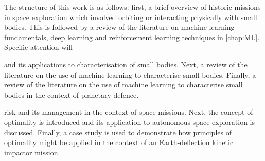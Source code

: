 The structure of this work is as follows: first, a brief overview of historic missions in space exploration which involved orbiting or interacting physically with small bodies. This is followed by a review of the literature on machine learning fundamentals, deep learning and reinforcement learning techniques in \autoref{chap:ML}. Specific attention will 

 and its applications to characterisation of small bodies. Next, a review of the literature on the use of machine learning to characterise small bodies. Finally, a review of the literature on the use of machine learning to characterise small bodies in the context of planetary defence.

risk and its management in the context of space missions. Next, the concept of optimality is introduced and its application to autonomous space exploration is discussed. Finally, a case study is used to demonstrate how principles of optimality might be applied in the context of an Earth-deflection kinetic impactor mission.






\cite{Rivkin2021}







\cite{Marks2022}



%


